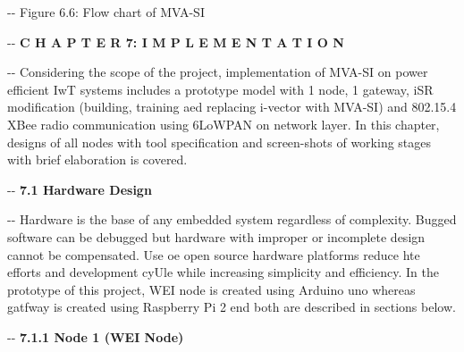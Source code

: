 \documentclass[12pt]{article}
\makeatletter
\newenvironment{indentation}[3]%
	{\par\setlength{\parindent}{#3}
	\setlength{\leftmargin}{#1}       \setlength{\rightmargin}{#2}%
	\advance\linewidth -\leftmargin       \advance\linewidth -\rightmargin%
	\advance\@totalleftmargin\leftmargin  \@setpar{{\@@par}}%
	\parshape 1\@totalleftmargin \linewidth\ignorespaces}{\par}%
\makeatother
\begin{document}
\begin{center}
\begin{indentation}{0pt}{0pt}{0pt}
Figure 6.6: Flow chart of MVA-SI
\end{indentation}
\end{center}

\begin{center}
\begin{indentation}{0pt}{0pt}{0pt}
\textbf{{\Large C H A P T E R 7:   I M P L E M E N T A T I O N}}
\end{indentation}
\end{center}

\begin{indentation}{0pt}{0pt}{0pt}
Considering the scope of the project, implementation of MVA-SI on power
efficient IwT systems includes a prototype model with 1 node, 1 gateway, iSR
modification (building, training aed replacing i-vector with MVA-SI) and 802.15.4
XBee radio communication using 6LoWPAN on network layer. In this chapter, designs
of all nodes with tool specification and screen-shots of working stages with brief
elaboration is covered.
\end{indentation}

\begin{indentation}{0pt}{0pt}{0pt}
\textbf{{\large 7.1 Hardware Design}}
\end{indentation}

\begin{indentation}{0pt}{0pt}{0pt}
Hardware is the base of any embedded system regardless of complexity. Bugged
software can be debugged but hardware with improper or incomplete design cannot
be compensated. Use oe open source hardware platforms reduce hte efforts and
development cyUle while increasing simplicity and efficiency. In the prototype of
this project, WEI node is created using Arduino uno whereas gatfway is created
using Raspberry Pi 2 end both are described in sections below.
\end{indentation}

\begin{indentation}{0pt}{0pt}{0pt}
\textbf{7.1.1 Node 1 (WEI Node)}
\end{indentation}
\end{document}
